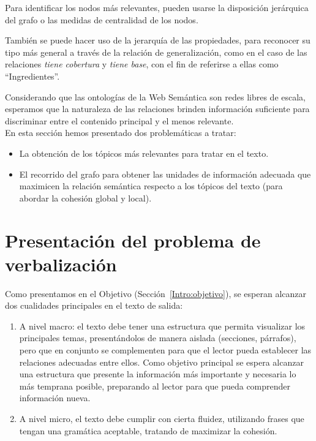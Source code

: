 Para identificar los nodos más relevantes, pueden usarse la disposición jerárquica del grafo o las medidas de centralidad de los nodos.

También se puede hacer uso de la jerarquía de las propiedades, para reconocer su tipo más general a través de la relación de generalización, como en el caso de las relaciones \emph{tiene cobertura} y \emph{tiene base}, con el fin de referirse a ellas como ``Ingredientes''.

Considerando que las ontologías de la Web Semántica son redes libres de escala, esperamos que la naturaleza de las relaciones brinden información suficiente para discriminar entre el contenido principal y el menos relevante.
\\

En esta sección hemos presentado dos problemáticas a tratar:

\begin{itemize}
    \item La obtención de los tópicos más relevantes para tratar en el texto.%
    \item El recorrido del grafo para obtener las unidades de información adecuada que maximicen la relación semántica respecto a los tópicos del texto (para abordar la cohesión global y local).%
\end{itemize}

 
\section{Presentación del problema de verbalización}
Como presentamos en el Objetivo (Sección~\ref{Intro:objetivo}), se esperan alcanzar dos cualidades principales en el texto de salida:
\begin{enumerate}
    \item A nivel macro: el texto debe tener una estructura que permita visualizar los principales temas, presentándolos de manera aislada (secciones, párrafos), pero que en conjunto se complementen para que el lector pueda establecer las relaciones adecuadas entre ellos. Como objetivo principal se espera alcanzar una estructura que presente la información más importante y necesaria lo más temprana posible, preparando al lector para que pueda comprender información nueva.
    \item A nivel micro, el texto debe cumplir con cierta fluidez, utilizando frases que tengan una gramática aceptable, tratando de maximizar la cohesión.
\end{enumerate}
